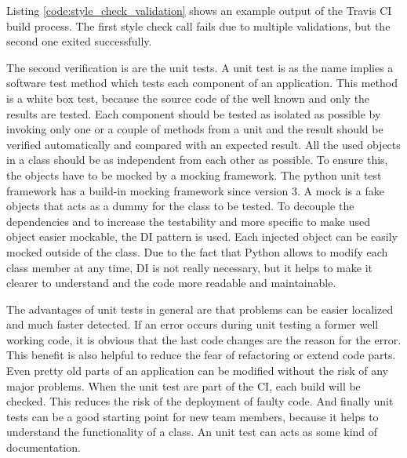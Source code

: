 Listing \ref{code:style_check_validation} shows an example output of the Travis \ac{CI} build process.
The first style check call fails due to multiple validations, but the second one exited successfully.\newline

The second verification is are the unit tests.
A unit test is as the name implies a software test method which tests each component of an application.
This method is a white box test, because the source code of the well known and only the results are tested.
Each component should be tested as isolated as possible by invoking only one or a couple of methods from a unit and the result should be verified automatically and compared with an expected result.\autocite[cf.][p. 320]{Olan:2003:UTT}
All the used objects in a class should be as independent from each other as possible.
To ensure this, the objects have to be mocked by a mocking framework.
The python unit test framework has a build-in mocking framework since version 3.
A mock is a fake objects that acts as a dummy for the class to be tested.
To decouple the dependencies and to increase the testability and more specific to make used object easier mockable, the \ac{DI} pattern is used.
Each injected object can be easily mocked outside of the class.
Due to the fact that Python allows to modify each class member at any time, \ac{DI} is not really necessary, but it helps to make it clearer to understand and the code more readable and maintainable.\newline

The advantages of unit tests in general are that problems can be easier localized and much faster detected.
If an error occurs during unit testing a former well working code, it is obvious that the last code changes are the reason for the error.
This benefit is also helpful to reduce the fear of refactoring or extend code parts.
Even pretty old parts of an application can be modified without the risk of any major problems.
When the unit test are part of the \ac{CI}, each build will be checked.
This reduces the risk of the deployment of faulty code.
And finally unit tests can be a good starting point for new team members, because it helps to understand the functionality of a class.
An unit test can acts as some kind of documentation.

